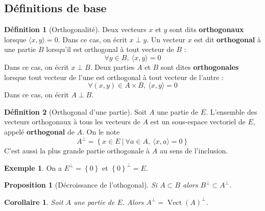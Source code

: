 \documentclass[french]{book}
\theoremstyle{plain}
\newtheorem{prop}{Proposition}[chapter]
\newtheorem{cor}{Corollaire}[chapter]
\theoremstyle{definition}
\newtheorem{dfn}{Définition}[chapter]
\newtheorem{exa}{Exemple}[chapter]
\theoremstyle{remark}
\DeclareMathOperator{\vect}{Vect}
\begin{document}
\subsection{Définitions de base}
\begin{dfn}[Orthogonalité]
	Deux vecteurs $x$ et $y$ sont dits \textbf{orthogonaux} lorsque $\langle x,y\rangle=0$. Dans ce cas, on écrit $x\perp y$. Un vecteur $x$ est dit \textbf{orthogonal} à une partie $B$ lorsqu'il est orthogonal à tout vecteur de $B$ : $$\forall y \in B, \ \langle x,y\rangle=0$$ Dans ce cas, on écrit $x\perp B$. Deux parties $A$ et $B$ sont dites \textbf{orthogonales} lorsque tout vecteur de l'une est orthogonal à tout vecteur de l'autre : $$\forall (x,y)\in A\times B,\ \langle x,y\rangle=0$$ Dans ce cas, on écrit $A\perp B$.
\end{dfn}
\begin{dfn}[Orthogonal d'une partie]
	Soit $A$ une partie de $E$. L'ensemble des vecteurs orthogonaux à tous les vecteurs de $A$ est un sous-espace vectoriel de $E$, appelé \textbf{orthogonal} de $A$. On le note $$A^\perp =\left\{x\in E \ | \ \forall a\in A, \ \langle x,a\rangle=0\right\}$$ C'est aussi la plus grande partie orthogonale à $A$ au sens de l'inclusion.
\end{dfn}
\begin{exa}
	On a $E^\perp=\left\{0\right\}$ et $\left\{0\right\}^\perp=E$.
\end{exa}
\begin{prop}[Décroissance de l'othogonal]
	Si $A\subset B$ alors $B^\perp\subset A^\perp$.
\end{prop}
\begin{cor}
	Soit $A$ une partie de $E$. Alors $A^\perp=\vect(A)^\perp$.
\end{cor}
\end{document}
